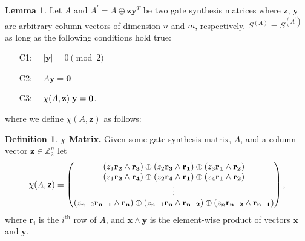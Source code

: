 \documentclass[notitlepage]{article}
\theoremstyle{definition}
\newtheorem{definition}{Definition}[section]
\theoremstyle{problem}
\theoremstyle{lemma}
\newtheorem{lemma}{Lemma}[section]
\begin{document}

		
		\theoremstyle{lemma}
		\begin{lemma}{}
			\label{lem1}
			Let $A$ and $A^\prime = A \oplus \mathbf{z}\mathbf{y}^T$ be two gate synthesis matrices where $\mathbf{z}$, $\mathbf{y}$ are arbitrary column vectors of dimension $n$ and $m$, respectively. $S^{(A)} = S^{(A^\prime)}$ as long as the following conditions hold true:
			\begin{enumerate}
				\item [C1:] $\quad |\mathbf{y}| = 0\pmod{2}$
				\item [C2:] $\quad A\mathbf{y} = \mathbf{0}$
				\item [C3:] $\quad \chi(A,\mathbf{z})\hspace{1mm}\mathbf{y} = \mathbf{0}$.
			\end{enumerate}
			where we define $\chi(A,\mathbf{z})$ as follows:
			\begin{definition}{\textbf{$\chi$ Matrix.}}
				Given some gate synthesis matrix, $A$, and a column vector $\mathbf{z}\in\mathbb{Z}_2^n$ let					
				\begin{equation*}
				\chi(A,\mathbf{z}) = \normalsize\begin{pmatrix}
				(z_1\mathbf{r_2}\wedge\mathbf{r_3})\oplus (z_2\mathbf{r_3}\wedge\mathbf{r_1})\oplus (z_3\mathbf{r_1}\wedge\mathbf{r_2})\\
				(z_1\mathbf{r_2}\wedge\mathbf{r_4})\oplus (z_2\mathbf{r_4}\wedge\mathbf{r_1})\oplus (z_4\mathbf{r_1}\wedge\mathbf{r_2})\\
				\vdots \\
				(z_{n-2}\mathbf{r_{n-1}}\wedge\mathbf{r_{n}})\oplus (z_{n-1}\mathbf{r_{n}}\wedge\mathbf{r_{n-2}})\oplus (z_{n}\mathbf{r_{n-2}}\wedge\mathbf{r_{n-1}})\\
				\end{pmatrix}\large,
				\end{equation*}
				where $\mathbf{r_i}$ is the $i^{\text{th}}$ row of $A$, and $\mathbf{x}\wedge\mathbf{y}$ is the element-wise product of vectors $\mathbf{x}$ and $\mathbf{y}$.
			\end{definition}
		\end{lemma}
\end{document}
